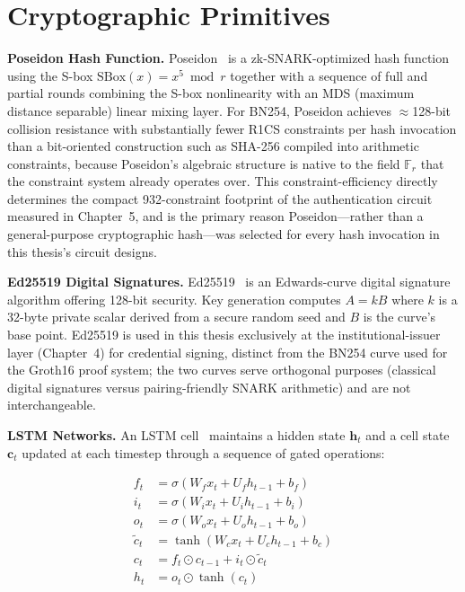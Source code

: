 \documentclass[12pt,a4paper,oneside]{report}
\begin{document}
\section{Cryptographic Primitives}

\textbf{Poseidon Hash Function.} Poseidon~\cite{poseidon} is a
zk-SNARK-optimized hash function using the S-box
$\text{SBox}(x) = x^5 \bmod r$ together with a sequence of full and
partial rounds combining the S-box nonlinearity with an MDS (maximum
distance separable) linear mixing layer. For BN254, Poseidon achieves
$\approx$128-bit collision resistance with substantially fewer R1CS
constraints per hash invocation than a bit-oriented construction such as
SHA-256 compiled into arithmetic constraints, because Poseidon's algebraic
structure is native to the field $\mathbb{F}_r$ that the constraint system
already operates over. This constraint-efficiency directly determines the
compact 932-constraint footprint of the authentication circuit measured
in Chapter~5, and is the primary reason Poseidon---rather than a
general-purpose cryptographic hash---was selected for every hash
invocation in this thesis's circuit designs.

\textbf{Ed25519 Digital Signatures.} Ed25519~\cite{bernstein2011} is an
Edwards-curve digital signature algorithm offering 128-bit security. Key
generation computes $A = kB$ where $k$ is a 32-byte private scalar derived
from a secure random seed and $B$ is the curve's base point. Ed25519 is
used in this thesis exclusively at the institutional-issuer layer
(Chapter~4) for credential signing, distinct from the BN254 curve used for
the Groth16 proof system; the two curves serve orthogonal purposes
(classical digital signatures versus pairing-friendly SNARK arithmetic)
and are not interchangeable.

\textbf{LSTM Networks.} An LSTM cell~\cite{hochreiter97} maintains a
hidden state $\mathbf{h}_t$ and a cell state $\mathbf{c}_t$ updated at
each timestep through a sequence of gated operations:

\begin{align}
  f_t &= \sigma(W_f x_t + U_f h_{t-1} + b_f) \\
  i_t &= \sigma(W_i x_t + U_i h_{t-1} + b_i) \\
  o_t &= \sigma(W_o x_t + U_o h_{t-1} + b_o) \\
  \tilde{c}_t &= \tanh(W_c x_t + U_c h_{t-1} + b_c) \\
  c_t &= f_t \odot c_{t-1} + i_t \odot \tilde{c}_t \\
  h_t &= o_t \odot \tanh(c_t)
\end{align}
\end{document}
